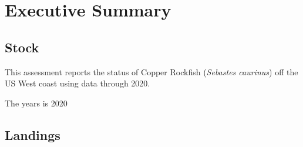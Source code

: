\documentclass[11pt,
  english,
  a4paper,
]{article}
\begin{document}
\newcommand{\lt}{\ensuremath <}
\newcommand{\gt}{\ensuremath >}

\newlength{\cslhangindent}
\setlength{\cslhangindent}{1.5em}
\newenvironment{cslreferences}%
  {\setlength{\parindent}{0pt}%
  \everypar{\setlength{\hangindent}{\cslhangindent}}\ignorespaces}%
  {\par}

\pagebreak
{}
\setcounter{page}{1}
\renewcommand{\thetable}{\roman{table}}
\renewcommand{\thefigure}{\roman{figure}}


\hypertarget{executive-summary}{%
\section*{Executive Summary}\label{executive-summary}}

\leavevmode\tagmcend\tagstructend


\hypertarget{stock}{%
\subsection*{Stock}\label{stock}}

\leavevmode\tagmcend\tagstructend


This assessment reports the status of Copper Rockfish (\emph{Sebastes caurinus}) off the US West coast using data through 2020.

\leavevmode\tagmcend\tagstructend\par


The years is 2020

\leavevmode\tagmcend\tagstructend\par


\hypertarget{landings}{%
\subsection*{Landings}\label{landings}}
\end{document}
